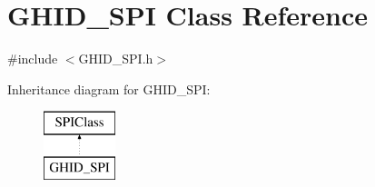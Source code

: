\hypertarget{class_g_h_i_d___s_p_i}{\section{\-G\-H\-I\-D\-\_\-\-S\-P\-I \-Class \-Reference}
\label{class_g_h_i_d___s_p_i}
}


{\ttfamily \#include $<$\-G\-H\-I\-D\-\_\-\-S\-P\-I.\-h$>$}

\-Inheritance diagram for \-G\-H\-I\-D\-\_\-\-S\-P\-I\-:\begin{figure}[H]
\begin{center}
\leavevmode
\includegraphics[height=2.000000cm]{class_g_h_i_d___s_p_i}
\end{center}
\end{figure}
